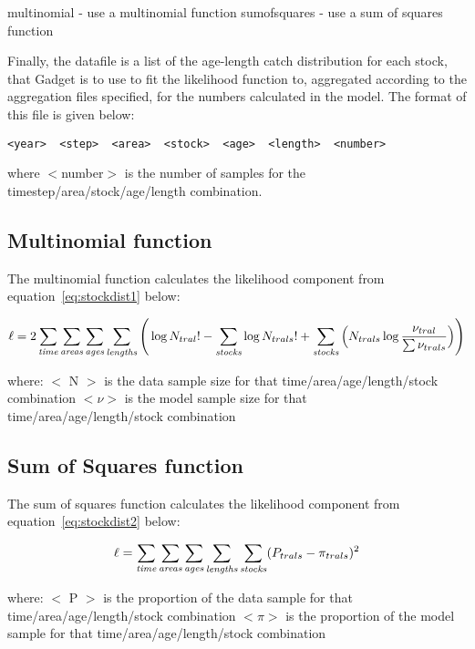 \documentclass [a4paper, 10pt]{book}
\begin{document}
\bigskip
multinomial - use a multinomial function\newline
sumofsquares - use a sum of squares function

\bigskip
Finally, the datafile is a list of the age-length catch distribution for each stock, that Gadget is to use to fit the likelihood function to, aggregated according to the aggregation files specified, for the numbers calculated in the model.  The format of this file is given below:

{\small\begin{verbatim}
<year>  <step>  <area>  <stock>  <age>  <length>  <number>
\end{verbatim}}

where $<$number$>$ is the number of samples for the timestep/area/stock/age/length combination.

\subsection{Multinomial function}
The multinomial function calculates the likelihood component from equation~\ref{eq:stockdist1} below:

\begin{equation}\label{eq:stockdist1}
\ell = 2 \sum_{\it time}\sum_{\it areas}\sum_{\it ages}\sum_{\it lengths} \Bigg( \log N_{tral}! - \sum_{\it stocks} \log N_{trals}! + \sum_{\it stocks} \Big( N_{trals} \log {\frac{\nu_{tral}}{\sum \nu_{trals}}} \Big)\Bigg)
\end{equation}

where:\newline
$<$ N $>$ is the data sample size for that time/area/age/length/stock combination\newline
$<\nu>$ is the model sample size for that time/area/age/length/stock combination

\subsection{Sum of Squares function}
The sum of squares function calculates the likelihood component from equation~\ref{eq:stockdist2} below:

\begin{equation}\label{eq:stockdist2}
\ell = \sum_{\it time}\sum_{\it areas}\sum_{\it ages}\sum_{\it lengths}\sum_{\it stocks} ( P_{trals} - \pi_{trals} ) ^2
\end{equation}

where:\newline
$<$ P $>$ is the proportion of the data sample for that time/area/age/length/stock combination\newline
$<\pi>$ is the proportion of the model sample for that time/area/age/length/stock combination
\end{document}
